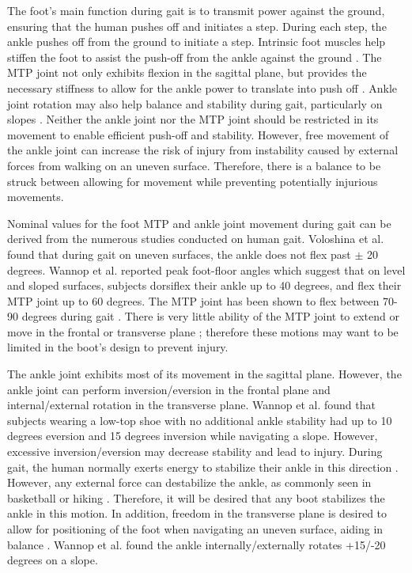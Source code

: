 \documentclass[defaultstyle,11pt]{thesis}
\begin{document}
The foot's main function during gait is to transmit power against the ground, ensuring that the human pushes off and initiates a step.
During each step, the ankle pushes off from the ground to initiate a step.
Intrinsic foot muscles help stiffen the foot to assist the push-off from the ankle against the ground \citep{Farris2019}.
The MTP joint not only exhibits flexion in the sagittal plane, but provides the necessary stiffness to allow for the ankle power to translate into push off \citep{Stefanyshyn1997}.
Ankle joint rotation may also help balance and stability during gait, particularly on slopes \citep{Wannop2014}. Neither the ankle joint nor the MTP joint should be restricted in its movement to enable efficient push-off and stability.
However, free movement of the ankle joint can increase the risk of injury from instability caused by external forces from walking on an uneven surface.
Therefore, there is a balance to be struck between allowing for movement while preventing potentially injurious movements.

Nominal values for the foot MTP and ankle joint movement during gait can be derived from the numerous studies conducted on human gait.
Voloshina et al. \citep{Voloshina2013} found that during gait on uneven surfaces, the ankle does not flex past \(\pm\) 20 degrees.
Wannop et al. \citep{Wannop2014} reported peak foot-floor angles which suggest that on level and sloped surfaces, subjects dorsiflex their ankle up to 40 degrees, and flex their MTP joint up to 60 degrees.
The MTP joint has been shown to flex between 70-90 degrees during gait \citep{Mann1979}.
There is very little ability of the MTP joint to extend or move in the frontal or transverse plane \citep{Mann1979}; therefore these motions may want to be limited in the boot's design to prevent injury.

The ankle joint exhibits most of its movement in the sagittal plane.
However, the ankle joint can perform inversion/eversion in the frontal plane and internal/external rotation in the transverse plane.
Wannop et al. \citep{Wannop2014} found that subjects wearing a low-top shoe with no additional ankle stability had up to 10 degrees eversion and 15 degrees inversion while navigating a slope.
However, excessive inversion/eversion may decrease stability and lead to injury.
During gait, the human normally exerts energy to stabilize their ankle in this direction \citep{OLoughlin2009}.
However, any external force can destabilize the ankle, as commonly seen in basketball or hiking \citep{Bohm2010}.
Therefore, it will be desired that any boot stabilizes the ankle in this motion.
In addition, freedom in the transverse plane is desired to allow for positioning of the foot when navigating an uneven surface, aiding in balance \citep{Wannop2014, Fraser2016a}.
Wannop et al. \citep{Wannop2014} found the ankle internally/externally rotates +15/-20 degrees on a slope.
\end{document}
